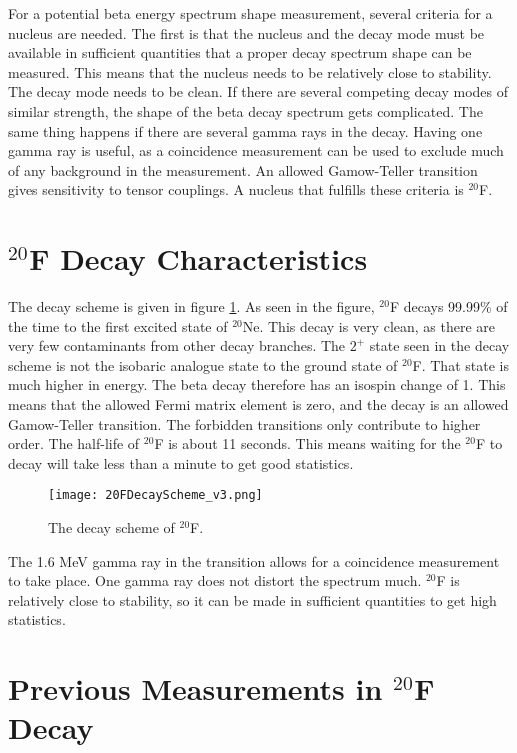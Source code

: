 \documentclass[../MaxHughesThesis.tex]{subfiles}
\begin{document}
For a potential beta energy spectrum shape measurement, several criteria for a nucleus are needed.
The first is that the nucleus and the decay mode must be available in sufficient quantities that a proper decay spectrum shape can be measured.
This means that the nucleus needs to be relatively close to stability.
The decay mode needs to be clean.
If there are several competing decay modes of similar strength, the shape of the beta decay spectrum gets complicated.
The same thing happens if there are several gamma rays in the decay. 
Having one gamma ray is useful, as a coincidence measurement can be used to exclude much of any background in the measurement.
An allowed Gamow-Teller transition gives sensitivity to tensor couplings. 
A nucleus that fulfills these criteria is $^{20}$F. 
 
\section{$^{20}$F Decay Characteristics}

The decay scheme is given in figure \ref{fig:DecayScheme}.
As seen in the figure, $^{20}$F decays 99.99\% of the time to the first excited state of $^{20}$Ne.
This decay is very clean, as there are very few contaminants from other decay branches. 
The $2^{+}$ state seen in the decay scheme is not the isobaric analogue state to the ground state of $^{20}$F.
That state is much higher in energy.
The beta decay therefore has an isospin change of 1.
This means that the allowed Fermi matrix element is zero, and the decay is an allowed Gamow-Teller transition. 
The forbidden transitions only contribute to higher order.
The half-life of $^{20}$F is about 11 seconds. 
This means waiting for the $^{20}$F to decay will take less than a minute to get good statistics.

\begin{figure}[!htb]
	\centerline{\texttt{[image: 20FDecayScheme\_v3.png]}}
	\caption{The decay scheme of $^{20}$F.}
	\label{fig:DecayScheme}
\end{figure}

The 1.6 MeV gamma ray in the transition allows for a coincidence measurement to take place.
One gamma ray does not distort the spectrum much. 
$^{20}$F is relatively close to stability, so it can be made in sufficient quantities to get high statistics.

\section{Previous Measurements in $^{20}$F Decay}
\end{document}
